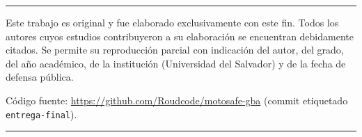 
\mbox{}
\vfill

{\small\onehalfspacing
\begin{center}

\noindent\rule{\textwidth}{1pt} %

    Este trabajo es original y fue elaborado exclusivamente con este fin.
    Todos los autores cuyos estudios contribuyeron a su elaboración se
    encuentran debidamente citados. Se permite su reproducción parcial con
    indicación del autor, del grado, del año académico, de la institución
    (Universidad del Salvador) y de la fecha de defensa pública.

    \bigskip
    Código fuente: \url{https://github.com/Roudcode/motosafe-gba}
    (commit etiquetado \texttt{entrega-final}).

\noindent\rule{\textwidth}{.2pt} %

\end{center}
} %
